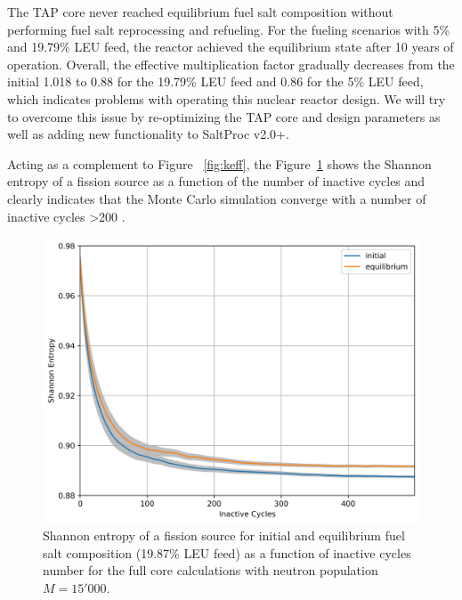 \documentclass[12pt]{article} %
\begin{document}
The \gls{TAP} core never reached equilibrium fuel salt composition without 
performing fuel salt reprocessing and refueling. For the fueling scenarios 
with 5\% and 19.79\% \gls{LEU} feed, the reactor achieved the equilibrium 
state after 10 years of operation. Overall, the effective multiplication 
factor gradually decreases from the initial 1.018 to 0.88 for the 19.79\% 
\gls{LEU} feed and 0.86 for the 5\% \gls{LEU} feed, which indicates 
problems with operating this nuclear reactor design. We will try to overcome 
this issue by re-optimizing the \gls{TAP} core and design parameters as well 
as adding new functionality to SaltProc v2.0+.

Acting as a complement to Figure ~\ref{fig:keff}, the Figure~\ref{fig:shannon} 
shows the Shannon entropy of a fission source as a function of the number of 
inactive cycles and clearly indicates that the Monte Carlo simulation 
converge with a number of inactive cycles >200 
\cite{brown_k-effective_2011-1}. 
\begin{figure}[htp!] %
  \centering
		  \includegraphics[width=\textwidth]{h_src.png}
	 \vspace{-0.35in}
  \caption{Shannon entropy of a fission source for initial and equilibrium 
  fuel salt composition (19.87\% \gls{LEU} feed) as a function of inactive 
  cycles number for the full core calculations with neutron population $M=15'000$.}
  \label{fig:shannon}
\end{figure}
\end{document}
